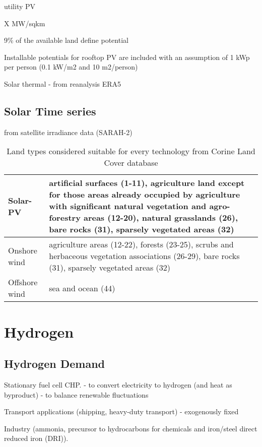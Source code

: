 utility PV

X MW/sqkm

9\% of the available land define potential 

Installable potentials for rooftop PV are included with an assumption of 1 kWp
per person (0.1 kW/m2 and 10 m2/person)

Solar thermal
- from reanalysis ERA5

\subsection{Solar Time series}

from satellite irradiance data (SARAH-2)


\begin{table}
    \caption{Land types considered suitable for every technology from Corine Land Cover database}
    \small
    \begin{tabularx}{\textwidth}{lX}
        \toprule
        Solar-PV & artificial surfaces (1-11), agriculture land except for those
        areas already occupied by agriculture with significant natural
        vegetation and agro-forestry areas (12-20), natural grasslands (26), bare rocks (31),
        sparsely vegetated areas (32) \\ \midrule
        Onshore wind & agriculture areas (12-22), forests (23-25), scrubs and herbaceous vegetation associations (26-29), bare rocks (31), sparsely vegetated areas (32) \\ \midrule
        Offshore wind & sea and ocean (44) \\ \bottomrule
    \end{tabularx}
\end{table}

\section{Hydrogen}

\subsection{Hydrogen Demand}

Stationary fuel cell CHP.
- to convert electricity to hydrogen (and heat as byproduct)
- to balance renewable fluctuations

Transport applications (shipping, heavy-duty transport)
- exogenously fixed

Industry (ammonia, precursor to hydrocarbons for chemicals and iron/steel direct reduced iron (DRI)).

